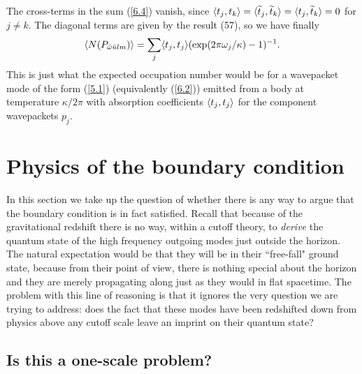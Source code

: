 The cross-terms in the sum (\ref{6.4}) vanish, since
$\langle t_j,t_k\rangle=\langle\widetilde{t}_j,\widetilde{t}_k\rangle=
\langle t_j,\widetilde{t}_k\rangle=0$ for $j\ne k$.
The diagonal terms are given by the result (57), so we have
finally
\begin{equation} \langle N(P_{\bar{\omega}\bar{u} lm})\rangle=
\sum_j \langle t_j,t_j\rangle(\exp(2\pi\omega_j/\kappa)-1)^{-1}.
\end{equation}
This is just what the expected occupation number would be
for a wavepacket mode of the form (\ref{5.1}) (equivalently
(\ref{6.2})) emitted from a body at temperature $\kappa/2\pi$
with absorption coefficients
$\langle t_j,t_j\rangle$
for the component wavepackets $p_j$.


\section{Physics of the boundary condition}
\label{sec:6}

In this section we take up the question of
whether there is any way to argue that the
boundary condition is in fact satisfied.
Recall that because of the gravitational redshift
there is no way, within a cutoff theory, to
{\it derive} the quantum state of the high
frequency outgoing modes just outside
the horizon.
The natural expectation would be that they will be in their
``free-fall" ground state, because from their
point of view, there is nothing special about the
horizon and they are merely propagating along just
as they would in flat spacetime. The problem with
this line of reasoning is that it ignores the very
question we are trying to address: does the fact
that these modes have been redshifted down from
physics above any cutoff scale leave an imprint
on their quantum state?


\subsection{Is this a one-scale problem?}

